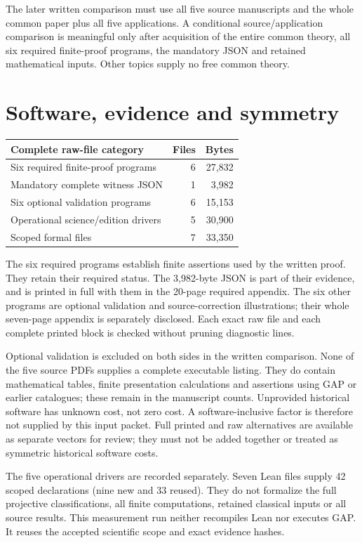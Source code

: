 \documentclass[11pt,a4paper]{article}
\begin{document}
The later written comparison must use all five source manuscripts and the whole common paper plus all five applications. A conditional source/application comparison is meaningful only after acquisition of the entire common theory, all six required finite-proof programs, the mandatory JSON and retained mathematical inputs. Other topics supply no free common theory.
\newpage
\section*{Software, evidence and symmetry}
\begin{center}\small\begin{tabular}{lrr}\toprule
Complete raw-file category & Files & Bytes\\\midrule
Six required finite-proof programs & 6 & 27,832 \\
Mandatory complete witness JSON & 1 & 3,982 \\
Six optional validation programs & 6 & 15,153 \\
Operational science/edition drivers & 5 & 30,900 \\
Scoped formal files & 7 & 33,350 \\
\bottomrule\end{tabular}\end{center}
The six required programs establish finite assertions used by the written proof. They retain their required status. The 3,982-byte JSON is part of their evidence, and is printed in full with them in the 20-page required appendix. The six other programs are optional validation and source-correction illustrations; their whole seven-page appendix is separately disclosed. Each exact raw file and each complete printed block is checked without pruning diagnostic lines.

Optional validation is excluded on both sides in the written comparison. None of the five source PDFs supplies a complete executable listing. They do contain mathematical tables, finite presentation calculations and assertions using GAP or earlier catalogues; these remain in the manuscript counts. Unprovided historical software has unknown cost, not zero cost. A software-inclusive factor is therefore not supplied by this input packet. Full printed and raw alternatives are available as separate vectors for review; they must not be added together or treated as symmetric historical software costs.

The five operational drivers are recorded separately. Seven Lean files supply 42 scoped declarations (nine new and 33 reused). They do not formalize the full projective classifications, all finite computations, retained classical inputs or all source results. This measurement run neither recompiles Lean nor executes GAP. It reuses the accepted scientific scope and exact evidence hashes.
\end{document}
